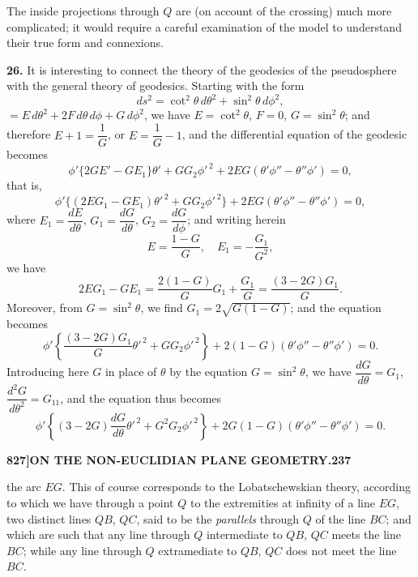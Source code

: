 \documentclass[11pt,a4paper]{book}
\begin{document}
The inside projections through $Q$ are (on account of the crossing) much more complicated; it would require a careful examination of the model to understand their true form and connexions.

\noindent\textbf{26.} It is interesting to connect the theory of the geodesics of the pseudosphere with the general theory of geodesics. Starting with the form
\[
ds^2 = \cot^2\theta\, d\theta^2 + \sin^2\theta\, d\phi^2,
\]
$= E\,d\theta^2 + 2F\,d\theta\,d\phi + G\,d\phi^2$, we have $E = \cot^2\theta$, $F = 0$, $G = \sin^2\theta$; and therefore $E + 1 = \dfrac{1}{G}$, or $E = \dfrac{1}{G} - 1$, and the differential equation of the geodesic becomes
\[
\phi'\{2GE' - GE_1\}\theta' + GG_2\phi'^{\,2} + 2EG(\theta'\phi'' - \theta''\phi') = 0,
\]
that is,
\[
\phi'\{(2EG_1 - GE_1)\theta'^{\,2} + GG_2\phi'^{\,2}\} + 2EG(\theta'\phi'' - \theta''\phi') = 0,
\]
where $E_1 = \dfrac{dE}{d\theta}$, $G_1 = \dfrac{dG}{d\theta}$, $G_2 = \dfrac{dG}{d\phi}$; and writing herein
\[
E = \frac{1-G}{G}, \quad E_1 = -\frac{G_1}{G^2},
\]
we have
\[
2EG_1 - GE_1 = \frac{2(1-G)}{G}G_1 + \frac{G_1}{G} = \frac{(3-2G)G_1}{G}.
\]
Moreover, from $G = \sin^2\theta$, we find $G_1 = 2\sqrt{G(1-G)}$; and the equation becomes
\[
\phi'\left\{\frac{(3-2G)G_1}{G}\theta'^{\,2} + GG_2\phi'^{\,2}\right\} + 2(1-G)(\theta'\phi'' - \theta''\phi') = 0.
\]
Introducing here $G$ in place of $\theta$ by the equation $G = \sin^2\theta$, we have $\dfrac{dG}{d\theta} = G_1$, $\dfrac{d^2G}{d\theta^2} = G_{11}$, and the equation thus becomes
\[
\phi'\left\{(3-2G)\frac{dG}{d\theta}\theta'^{\,2} + G^2G_2\phi'^{\,2}\right\} + 2G(1-G)(\theta'\phi'' - \theta''\phi') = 0.
\]

\newpage
\setcounter{page}{237}

\noindent\textbf{827]}\hfill\textbf{ON THE NON-EUCLIDIAN PLANE GEOMETRY.}\hfill\textbf{237}

\bigskip

\noindent the arc $EG$. This of course corresponds to the Lobatschewskian theory, according to which we have through a point $Q$ to the extremities at infinity of a line $EG$, two distinct lines $QB$, $QC$, said to be the \textit{parallels} through $Q$ of the line $BC$; and which are such that any line through $Q$ intermediate to $QB$, $QC$ meets the line $BC$; while any line through $Q$ extramediate to $QB$, $QC$ does not meet the line $BC$.
\end{document}
